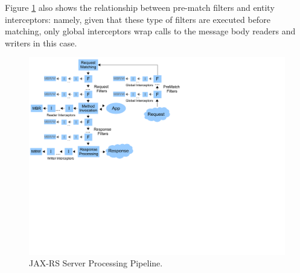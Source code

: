 Figure \ref{jaxrs_pipeline} also shows the relationship between pre-match filters and entity interceptors: namely, given that these type of filters are executed before matching, only global interceptors wrap calls to the message body readers and writers in this case.

\begin{figure}[H]
\label{jaxrs_pipeline}
\centering
\includegraphics{chapters/jaxrs_pipeline.pdf}
\caption{JAX-RS Server Processing Pipeline.}
\end{figure}

